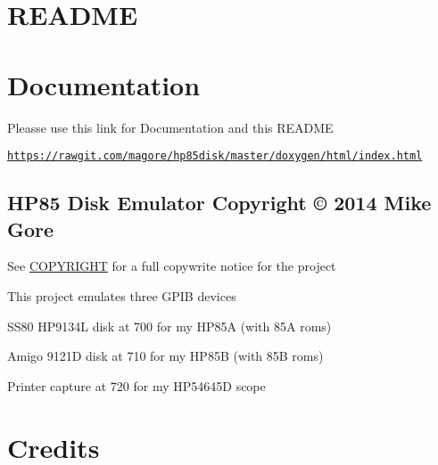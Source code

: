 \hypertarget{md_README_README}{}\section{R\-E\-A\-D\-M\-E}\label{md_README_README}
\section*{Documentation}


\begin{DoxyItemize}
\item Pleasse use this link for Documentation and this R\-E\-A\-D\-M\-E
\begin{DoxyItemize}
\item \href{https://rawgit.com/magore/hp85disk/master/doxygen/html/index.html}{\tt https\-://rawgit.\-com/magore/hp85disk/master/doxygen/html/index.\-html}
\end{DoxyItemize}
\end{DoxyItemize}

\subsection*{H\-P85 Disk Emulator Copyright \copyright{} 2014 Mike Gore}


\begin{DoxyItemize}
\item See \hyperlink{md_COPYRIGHT}{C\-O\-P\-Y\-R\-I\-G\-H\-T} for a full copywrite notice for the project
\end{DoxyItemize}

This project emulates three G\-P\-I\-B devices
\begin{DoxyItemize}
\item S\-S80 H\-P9134\-L disk at 700 for my H\-P85\-A (with 85\-A roms)
\item Amigo 9121\-D disk at 710 for my H\-P85\-B (with 85\-B roms)
\item Printer capture at 720 for my H\-P54645\-D scope
\end{DoxyItemize}





\section*{Credits}

